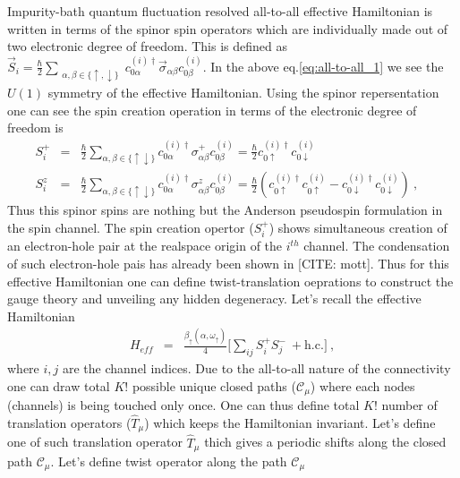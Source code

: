 \documentclass[reprint,prb,superscriptaddress]{revtex4-2}
\begin{document}
Impurity-bath quantum fluctuation resolved all-to-all effective Hamiltonian is written in terms of the spinor spin operators which are individually made out of two electronic degree of freedom. This is defined as $\vec{S}_i=\frac{\hbar}{2} \displaystyle\sum_{\substack{ \alpha,\beta\in \{\uparrow,\downarrow\}}}  c_{0\alpha}^{(i)\dagger} \vec{\sigma}_{\alpha\beta} c_{0\beta}^{(i)}$. In the above eq.\eqref{eq:all-to-all_1} we see the $U(1)$ symmetry of the effective Hamiltonian. Using the spinor repersentation one can see the spin creation operation in terms of the electronic degree of freedom is 
\begin{eqnarray}
S_i^+ &=& \frac{\hbar}{2} \displaystyle\sum_{\alpha,\beta\in \{\uparrow\downarrow\}} c_{0\alpha}^{(i)\dagger} {\sigma}^{+}_{\alpha\beta} c_{0\beta}^{(i)}
=\frac{\hbar}{2} c_{0\uparrow}^{(i)\dagger} c_{0\downarrow}^{(i)}  \\
S_i^z &=& \frac{\hbar}{2} \displaystyle\sum_{\alpha,\beta\in \{\uparrow\downarrow\}} c_{0\alpha}^{(i)\dagger} {\sigma}^{z}_{\alpha\beta} c_{0\beta}^{(i)} =\frac{\hbar}{2} (c_{0\uparrow}^{(i)\dagger} c_{0\uparrow}^{(i)} - c_{0\downarrow}^{(i)\dagger} c_{0\downarrow}^{(i)} )~,~~~~
\end{eqnarray}
Thus this spinor spins are nothing but the Anderson pseudospin formulation in the spin channel. The spin creation opertor ($S_i^+$) shows simultaneous creation of an electron-hole pair at the realspace origin of the $i^{th}$ channel. The condensation of such electron-hole pais has already been shown in [CITE: mott]. Thus for this effective Hamiltonian one can define twist-translation oeprations to construct the gauge theory and unveiling any hidden degeneracy. Let's recall the effective Hamiltonian
\begin{eqnarray}
H_{eff} &=& \frac{\beta_{\uparrow}(\alpha,\omega_{\uparrow})}{4} \bigg[ \displaystyle\sum_{ij} S_i^+S_j^- ~+ \textrm{h.c.} \bigg]~,
\end{eqnarray}
where $i,j$ are the channel indices. Due to the all-to-all nature of the connectivity one can draw total $K!$ possible unique closed paths ($\mathcal{C}_{\mu}$) where each nodes (channels) is being touched only once. One can thus define total $K!$ number of translation operators ($\hat{T}_{\mu}$) which keeps the Hamiltonian invariant. Let's define one of such translation operator $\hat{T}_{\mu}$ thich gives a periodic shifts along the closed path $\mathcal{C}_{\mu}$. Let's define twist operator along the path $\mathcal{C}_{\mu}$
\end{document}

